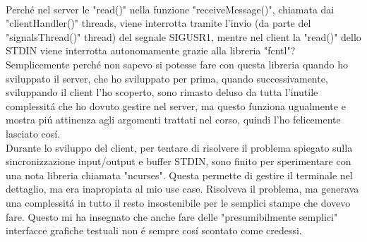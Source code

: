  \\
 Perch\'e nel server le "read()" nella funzione "receiveMessage()", chiamata dai "clientHandler()" threads, viene interrotta tramite l'invio (da parte del "signalsThread()" thread) del segnale SIGUSR1, mentre nel client la "read()" dello STDIN viene interrotta autonomamente grazie alla libreria "fcntl"? Semplicemente perch\'e non sapevo si potesse fare con questa libreria quando ho sviluppato il server, che ho sviluppato per prima, quando successivamente, sviluppando il client l'ho scoperto, sono rimasto deluso da tutta l'inutile complessit\'a che ho dovuto gestire nel server, ma questo funziona ugualmente e mostra pi\'u attinenza agli argomenti trattati nel corso, quindi l'ho felicemente lasciato cos\'i.
 \\
 Durante lo sviluppo del client, per tentare di risolvere il problema spiegato sulla sincronizzazione input/output e buffer STDIN, sono finito per sperimentare con una nota libreria chiamata "ncurses". Questa permette di gestire il terminale nel dettaglio, ma era inapropiata al mio use case. Risolveva il problema, ma generava una complessit\'a in tutto il resto insostenibile per le semplici stampe che dovevo fare. Questo mi ha insegnato che anche fare delle "presumibilmente semplici" interfacce grafiche testuali non \'e sempre cos\'i scontato come credessi.
 \\
